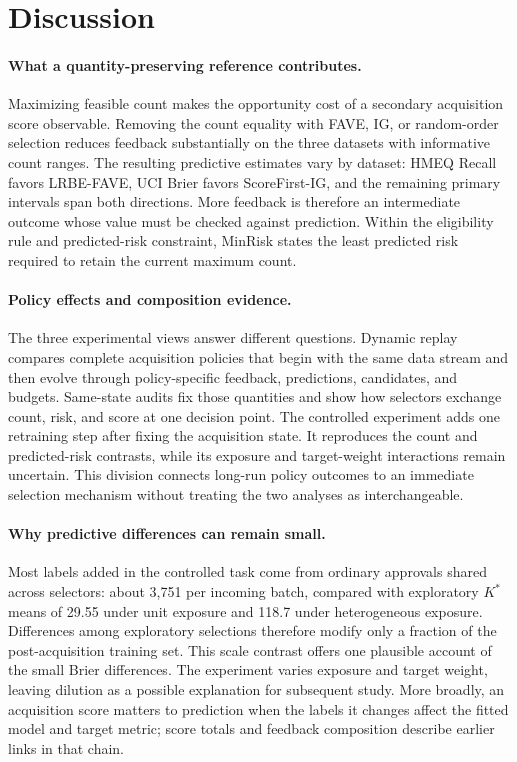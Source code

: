\section{Discussion}
\label{sec:discussion}

\paragraph{What a quantity-preserving reference contributes.}
Maximizing feasible count makes the opportunity cost of a secondary acquisition score observable. Removing the count equality with FAVE, IG, or random-order selection reduces feedback substantially on the three datasets with informative count ranges. The resulting predictive estimates vary by dataset: HMEQ Recall favors LRBE-FAVE, UCI Brier favors ScoreFirst-IG, and the remaining primary intervals span both directions. More feedback is therefore an intermediate outcome whose value must be checked against prediction. Within the eligibility rule and predicted-risk constraint, MinRisk states the least predicted risk required to retain the current maximum count.

\paragraph{Policy effects and composition evidence.}
The three experimental views answer different questions. Dynamic replay compares complete acquisition policies that begin with the same data stream and then evolve through policy-specific feedback, predictions, candidates, and budgets. Same-state audits fix those quantities and show how selectors exchange count, risk, and score at one decision point. The controlled experiment adds one retraining step after fixing the acquisition state. It reproduces the count and predicted-risk contrasts, while its exposure and target-weight interactions remain uncertain. This division connects long-run policy outcomes to an immediate selection mechanism without treating the two analyses as interchangeable.

\paragraph{Why predictive differences can remain small.}
Most labels added in the controlled task come from ordinary approvals shared across selectors: about 3,751 per incoming batch, compared with exploratory $K^*$ means of 29.55 under unit exposure and 118.7 under heterogeneous exposure. Differences among exploratory selections therefore modify only a fraction of the post-acquisition training set. This scale contrast offers one plausible account of the small Brier differences. The experiment varies exposure and target weight, leaving dilution as a possible explanation for subsequent study. More broadly, an acquisition score matters to prediction when the labels it changes affect the fitted model and target metric; score totals and feedback composition describe earlier links in that chain.

